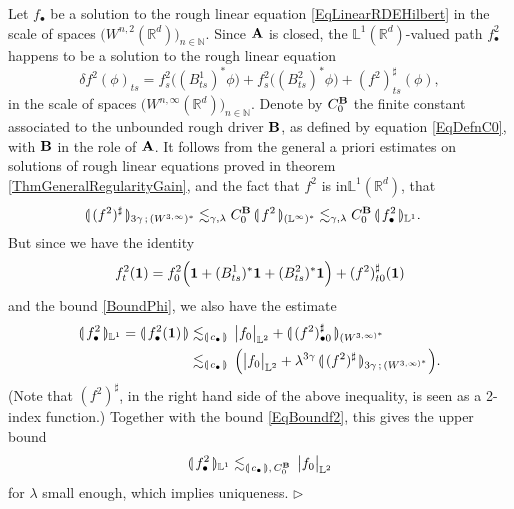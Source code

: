 \documentclass[11pt,a4paper]{amsart}
\newcommand{\NN}{\mathbb{N}}  \newcommand{\ZZ}{\mathbb{Z}}  \newcommand{\QQ}{\mathbb{Q}}  \newcommand{\HH}{\mathbb{H}}
\newcommand{\RR}{\mathbb{R}}  \newcommand{\CC}{\mathbb{C}}  \newcommand{\LL}{\mathbb{L}}  \newcommand{\WW}{\mathbb{W}}
\numberwithin{equation}{section} %
\newenvironment{Dem}{%
    \begin{list}{\hspace{0.5cm}{\sc Proof --}}{%
        \setlength{\topsep}{0pt}%
        \setlength{\leftmargin}{0pt}%
        \setlength{\rightmargin}{0pt}%
        \setlength{\listparindent}{0pt}%
        \setlength{\itemindent}{0pt}%
        \setlength{\parsep}{0pt}%
        \addtolength{\leftmargin}{20pt}%
        \addtolength{\rightmargin}{0pt}%
    } \item }{\hfill{\space $\rhd$}\end{list}\smallskip}
\begin{document}
\begin{Dem}
\noindent Let $f_\bullet$ be a solution to the rough linear equation \eqref{EqLinearRDEHilbert} in the scale of spaces $\big(W^{n,2}(\RR^d)\big)_{n\in\NN}$. Since $\bf A$ is closed, the $\LL^1(\RR^d)$-valued path $f^2_\bullet$ happens to be a solution to the rough linear equation
\begin{equation*} 
\delta f^2(\phi)_{ts} = f^2_s\big((B^1_{ts})^*\phi\big) + f^2_s\big((B^2_{ts})^*\phi\big) + (f^2)^\sharp_{ts}(\phi),
\end{equation*}
in the scale of spaces $\big(W^{n,\infty}(\RR^d)\big)_{n\in\NN}$. Denote by $C_0^{\bf B}$ the finite constant associated to the unbounded rough driver $\bf B$, as defined by equation \eqref{EqDefnC0}, with $\bf B$ in the role of $\bf A$. It follows from the general a priori estimates on solutions of rough linear equations proved in theorem  \ref{ThmGeneralRegularityGain}, and the fact that $f^2$ is in$\LL^1(\RR^d)$, that 
\begin{equation}
\label{EqBoundf2}
\begin{split}
\llparenthesis\, (f^2)^\sharp \,\rrparenthesis_{3\gamma\,;\,(W^{3,\infty})^*} &\lesssim_{\gamma,\lambda}C_0^{\bf B}\,\llparenthesis\, f^2 \,\rrparenthesis_{(\LL^\infty)^*} 
\lesssim _{\gamma,\lambda} C_0^{\bf B}\,\llparenthesis\, f^2_\bullet \,\rrparenthesis_{\LL^1}.
\end{split}
\end{equation}
But since we have the identity 
$$
f^2_t({\bf 1}) = f_0^2\Big({\bf 1} + (B^1_{ts})^*{\bf 1} + (B^2_{ts})^*{\bf 1}\Big) + (f^2)^\sharp_{t0}({\bf  1})
$$
and the bound \eqref{BoundPhi}, we also have the estimate
\begin{equation*}
\begin{split}
\llparenthesis\, f^2_\bullet \,\rrparenthesis_{\LL^1} = \llparenthesis\, f^2_\bullet({\bf 1}) \,\rrparenthesis &\lesssim_{\llparenthesis\,c_\bullet\,\rrparenthesis} \,\big| f_0 \big|_{\LL^2} + \llparenthesis\, (f^2)^\sharp_{\bullet 0} \,\rrparenthesis_{(W^{3,\infty)^*}}  \\
&\lesssim_{\llparenthesis\,c_\bullet\,\rrparenthesis} \, \Big( \big| f_0 \big|_{\LL^2} + \lambda^{3\gamma}\,\llparenthesis\, (f^2)^\sharp \,\rrparenthesis_{3\gamma\,;\,(W^{3,\infty)^*}} \Big).
\end{split}
\end{equation*}
(Note that $(f^2)^\sharp$, in the right hand side of the above inequality, is seen as a 2-index function.) Together with the bound \eqref{EqBoundf2}, this gives the upper bound
$$
\llparenthesis\, f^2_\bullet \,\rrparenthesis_{\LL^1} \lesssim_{\llparenthesis\,c_\bullet\,\rrparenthesis,\,C_0^{\bf B}} \,\big| f_0 \big|_{\LL^2}
$$
for $\lambda$ small enough, which implies uniqueness.
\end{Dem}
\end{document}
